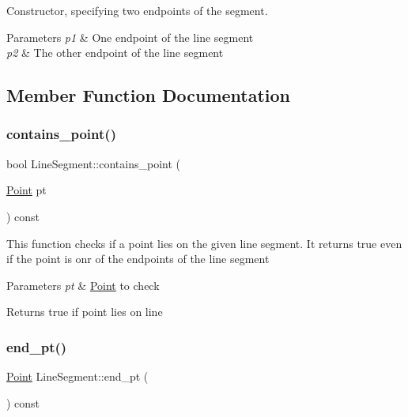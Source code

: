 Constructor, specifying two endpoints of the segment. 


\begin{DoxyParams}{Parameters}
{\em p1} & One endpoint of the line segment \\
\hline
{\em p2} & The other endpoint of the line segment \\
\hline
\end{DoxyParams}


\subsection{Member Function Documentation}
\mbox{\label{classLineSegment_a8dc46fa1dd259befff8cea92232e2a29}} 
\subsubsection{\texorpdfstring{contains\+\_\+point()}{contains\_point()}}
{\footnotesize\ttfamily bool Line\+Segment\+::contains\+\_\+point (\begin{DoxyParamCaption}\item[{\hyperlink{classPoint}{Point}}]{pt }\end{DoxyParamCaption}) const}

This function checks if a point lies on the given line segment. It returns true even if the point is onr of the endpoints of the line segment 
\begin{DoxyParams}{Parameters}
{\em pt} & \hyperlink{classPoint}{Point} to check \\
\hline
\end{DoxyParams}
\begin{DoxyReturn}{Returns}
true if point lies on line 
\end{DoxyReturn}
\mbox{\label{classLineSegment_aa6c90340de500bb72bdde2114f838d57}} 
\subsubsection{\texorpdfstring{end\+\_\+pt()}{end\_pt()}}
{\footnotesize\ttfamily \hyperlink{classPoint}{Point} Line\+Segment\+::end\+\_\+pt (\begin{DoxyParamCaption}{ }\end{DoxyParamCaption}) const}


